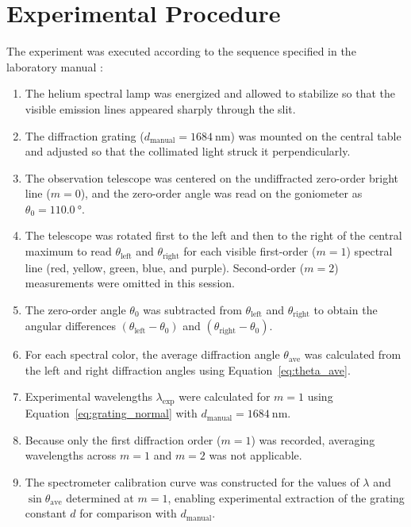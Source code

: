 \documentclass[journal]{IEEEtran}
\begin{document}
\section{Experimental Procedure}
The experiment was executed according to the sequence specified in the laboratory manual \cite{lab_manual}:
\begin{enumerate}
    \item The helium spectral lamp was energized and allowed to stabilize so that the visible emission lines appeared sharply through the slit.
    \item The diffraction grating ($d_{\text{manual}} = \SI{1684}{\nano\meter}$) was mounted on the central table and adjusted so that the collimated light struck it perpendicularly.
    \item The observation telescope was centered on the undiffracted zero-order bright line ($m = 0$), and the zero-order angle was read on the goniometer as $\theta_0 = \SI{110.0}{\degree}$.
    \item The telescope was rotated first to the left and then to the right of the central maximum to read $\theta_{\text{left}}$ and $\theta_{\text{right}}$ for each visible first-order ($m = 1$) spectral line (red, yellow, green, blue, and purple). Second-order ($m = 2$) measurements were omitted in this session.
    \item The zero-order angle $\theta_0$ was subtracted from $\theta_{\text{left}}$ and $\theta_{\text{right}}$ to obtain the angular differences $(\theta_{\text{left}} - \theta_0)$ and $(\theta_{\text{right}} - \theta_0)$.
    \item For each spectral color, the average diffraction angle $\theta_{\text{ave}}$ was calculated from the left and right diffraction angles using Equation~\eqref{eq:theta_ave}.
    \item Experimental wavelengths $\lambda_{\text{exp}}$ were calculated for $m = 1$ using Equation~\eqref{eq:grating_normal} with $d_{\text{manual}} = \SI{1684}{\nano\meter}$.
    \item Because only the first diffraction order ($m = 1$) was recorded, averaging wavelengths across $m = 1$ and $m = 2$ was not applicable.
    \item The spectrometer calibration curve was constructed for the values of $\lambda$ and $\sin\theta_{\text{ave}}$ determined at $m = 1$, enabling experimental extraction of the grating constant $d$ for comparison with $d_{\text{manual}}$.
\end{enumerate}
\end{document}

